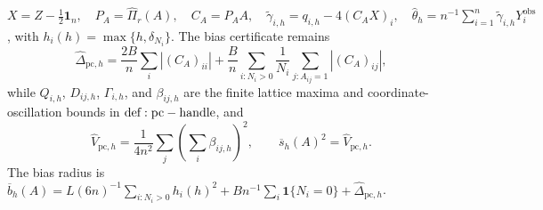 \(X=Z-\tfrac12\mathbf1_n,\quad P_A=\widehat\Pi_r(A),\quad C_A=P_AA,\quad \widetilde\gamma_{i,h}=q_{i,h}-4(C_AX)_i,\quad \widehat\theta_h=n^{-1}\sum_{i=1}^n\widetilde\gamma_{i,h}Y_i^{\mathrm{obs}}\), with \(h_i(h)=\max\{h,\delta_{N_i}\}\).  The bias certificate remains
\[
 \widehat\Delta_{\mathrm{pc},h}=\frac{2B}{n}\sum_i|(C_A)_{ii}|+\frac{B}{n}\sum_{i:N_i>0}\frac1{N_i}\sum_{j:A_{ij}=1}|(C_A)_{ij}|,
\]
while \(Q_{i,h}\), \(D_{ij,h}\), \(\Gamma_{i,h}\), and \(\beta_{ij,h}\) are the finite lattice maxima and coordinate-oscillation bounds in \({\rm def:pc-handle}\), and
\[
 \widehat V_{\mathrm{pc},h}=\frac1{4n^2}\sum_j\left(\sum_i\beta_{ij,h}\right)^2,
 \qquad
 \overline s_h(A)^2=\widehat V_{\mathrm{pc},h}.
\]
The bias radius is \(\overline b_h(A)=L(6n)^{-1}\sum_{i:N_i>0}h_i(h)^2+Bn^{-1}\sum_i\mathbf1\{N_i=0\}+\widehat\Delta_{\mathrm{pc},h}\).